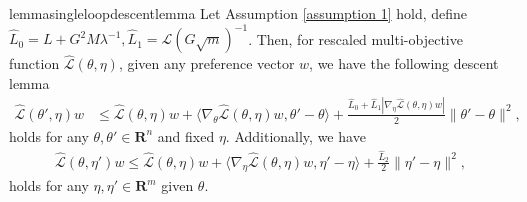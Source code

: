 \documentclass[twoside]{article} %
\theoremstyle{plain}
\theoremstyle{definition}
\theoremstyle{remark}
\newcommand{\hL}{\hat{L}}
\newcommand{\fL}{\mathcal{L}}
\newcommand{\fhL}{\hat{\mathcal{L}}}
\begin{document}
\begin{restatable}{lemma}{singleloopdescentlemma}
    Let Assumption \ref{assumption 1} hold, define $\hL_0 = L+G^2M\lambda^{-1}, \hL_1 = \fL(G\sqrt{m})^{-1}$. Then, for rescaled multi-objective function $\fhL({\theta}, {\eta})$, given any preference vector $w$,
    we have the following descent lemma
    \begin{align}
        \fhL({\theta}', {\eta}){w} &\leq \fhL({\theta}, {\eta}){w} + \langle\nabla_{{\theta}}\fhL({\theta}, {\eta}){w}, {\theta}'-{\theta} \rangle +\frac{\hL_0+\hL_1 |\nabla_{\eta}\fhL(\theta,\eta)w|}{2}\|{\theta}'-{\theta} \|^2,
        \label{eq: moo descent lemma theta}
\end{align}
holds for any $\theta,\theta'\in \mathbf{R}^n$ and fixed $\eta$. Additionally, we have
\begin{align}
        \fhL({\theta}, {\eta}'){w}\leq \fhL({\theta}, {\eta}){w} +\langle\nabla_{\eta}\fhL(\theta,\eta)w,\eta'-\eta \rangle + \frac{\hL_2}{2}\|\eta'-\eta\|^2,
        \label{eq: moo descent lemma eta}
\end{align}
holds for any $\eta,\eta'\in\mathbf{R}^m$ given $\theta$.

\end{restatable}
\end{document}
